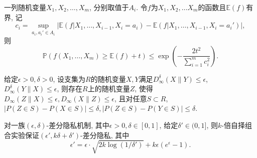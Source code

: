 \begin{thm}\label{thm:Azuma不等式}
  一列随机变量$X_1, X_2, \dots, X_m$, 分别取值于$A_i$. 令$f$为$X_1, X_2, \dots X_m$的函数且$\mathbb E(f)$有界, 记
  \[
    c_i = \sup_{a_i, a_i'\in A_i}\left| \mathbb E(f|X_1, \dots, X_{i-1}, X_i = a_i) - \mathbb E(f|X_1, \dots, X_{i-1}, X_i = a_i')\right|,
  \]
  则
  \[
    \mathbb P\left(f(X_1,\dots,X_m)\ge \mathbb E(f) + t\right) \le \exp\left( - \frac{2t^2}{\sum_{i=1}^m c_i^2}\right).
  \]
\end{thm}
\begin{thm}\label{thm:稠模型定理}
  给定$\epsilon > 0, \delta > 0$, 设支集为$R$的随机变量$X, Y$满足$D^\delta_\infty(X\|Y)\le\epsilon$, $D^\delta_\infty(Y\|X)\le\epsilon$, 则存在$R$上的随机变量$Z$, 使得$D_\infty(Z\|X)\le\epsilon, D_\infty(X\|Z)\le\epsilon$, 且对任意$S\subset R$, $|P(Z\in S) - P(X\in S)|\le\delta, |P(Z\in S) - P(Y\in S)|\le\delta$.
\end{thm}
\begin{thm}\label{thm:组合定理II}
  对一族$(\epsilon, \delta)$-差分隐私机制, 其中$\epsilon > 0, \delta\in[0, 1]$, 给定$\delta' \in (0, 1]$, 则$k$-倍自择组合实验保证$(\epsilon', k\delta + \delta')$-差分隐私, 其中
  \[
  \epsilon' = \epsilon\cdot\sqrt{2k\log(1/\delta')} + k\epsilon(e^\epsilon - 1).
  \]
\end{thm}
